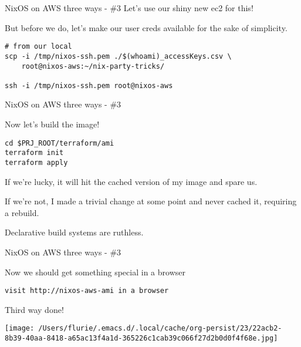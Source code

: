 \documentclass[bigger]{beamer}
\begin{document}
\begin{frame}[label={sec:org9c747a8},fragile]{NixOS on AWS three ways - \#3}
 Let's use our shiny new ec2  for this!

\begin{exampleblock}{But before we do, let's make our user creds available for the sake of simplicity.}
\tiny
\begin{verbatim}
# from our local
scp -i /tmp/nixos-ssh.pem ./$(whoami)_accessKeys.csv \
    root@nixos-aws:~/nix-party-tricks/

ssh -i /tmp/nixos-ssh.pem root@nixos-aws
\end{verbatim}
\end{exampleblock}
\end{frame}
\begin{frame}[label={sec:org412fe28},fragile]{NixOS on AWS three ways - \#3}
 \begin{exampleblock}{Now let's build the image!}
\begin{verbatim}
cd $PRJ_ROOT/terraform/ami
terraform init
terraform apply
\end{verbatim}

If we're lucky, it will hit the cached version of my image and spare us.

If we're not, I made a trivial change at some point and never cached it, requiring a rebuild.

Declarative build systems are ruthless.
\end{exampleblock}
\end{frame}
\begin{frame}[label={sec:org0702b86},fragile]{NixOS on AWS three ways - \#3}
 \begin{exampleblock}{Now we should get something special in a browser}
\begin{verbatim}
visit http://nixos-aws-ami in a browser
\end{verbatim}

Third way done!
\begin{center}
\texttt{[image: /Users/flurie/.emacs.d/.local/cache/org-persist/23/22acb2-8b39-40aa-8418-a65ac13f4a1d-365226c1cab39c066f27d2b0d0f4f68e.jpg]}
\end{center}
\end{exampleblock}
\end{frame}
\end{document}
